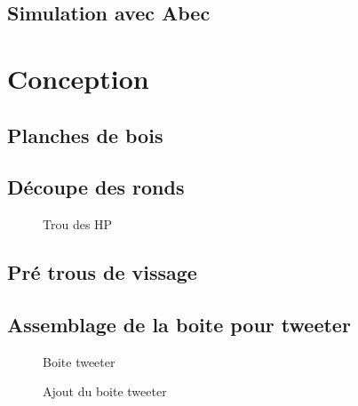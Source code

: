 \documentclass[a4paper,english]{report}
\begin{document}
			\section{Simulation avec Abec}
			
			\chapter{Conception}
					  
			 	
			
			\section{Planches de bois}

			
			\section{Découpe des ronds}

				\begin{figure}[H]
					\centering
					\label{Planche}
					\caption{Trou des HP}
				\end{figure}			
			

			
			\section{Pré trous de vissage}

			\section{Assemblage de la boite pour tweeter}

		
			    \begin{figure}[h!]
					 	
					 	\begin{minipage}[c]{.45\linewidth}
					 		\begin{center}
					 			\label{Boite tweeter}
					 			\caption{Boite tweeter}
					 		\end{center}
					 	\end{minipage}
					 	\hfill
					 	\begin{minipage}[c]{.45\linewidth}
					 		\begin{center}
					 		\label{Ajout du boite tweeter}
					 		\caption{Ajout du boite tweeter}
					 		\end{center}
					 	\end{minipage}
					 \end{figure} 	
			
\end{document}
